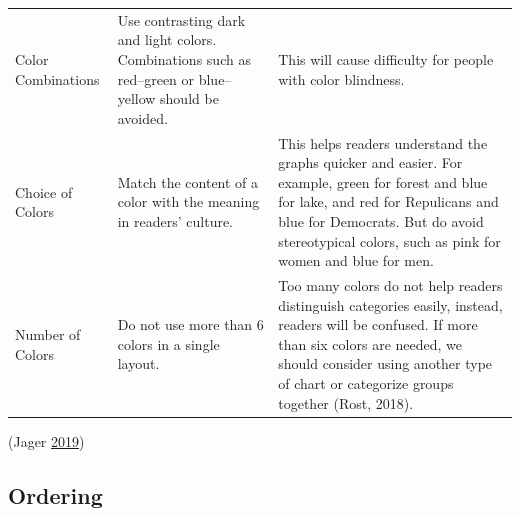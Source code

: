 \documentclass[]{book}
\begin{document}
\begin{longtable}[]{@{}lll@{}}
\begin{minipage}[t]{0.11\columnwidth}\raggedright
Color Combinations\strut
\end{minipage} & \begin{minipage}[t]{0.34\columnwidth}\raggedright
Use contrasting dark and light colors. Combinations such as red--green or blue-- yellow should be avoided.\strut
\end{minipage} & \begin{minipage}[t]{0.46\columnwidth}\raggedright
This will cause difficulty for people with color blindness.\strut
\end{minipage}\tabularnewline
\begin{minipage}[t]{0.11\columnwidth}\raggedright
Choice of Colors\strut
\end{minipage} & \begin{minipage}[t]{0.34\columnwidth}\raggedright
Match the content of a color with the meaning in readers' culture.\strut
\end{minipage} & \begin{minipage}[t]{0.46\columnwidth}\raggedright
This helps readers understand the graphs quicker and easier. For example, green for forest and blue for lake, and red for Repulicans and blue for Democrats. But do avoid stereotypical colors, such as pink for women and blue for men.\strut
\end{minipage}\tabularnewline
\begin{minipage}[t]{0.11\columnwidth}\raggedright
Number of Colors\strut
\end{minipage} & \begin{minipage}[t]{0.34\columnwidth}\raggedright
Do not use more than 6 colors in a single layout.\strut
\end{minipage} & \begin{minipage}[t]{0.46\columnwidth}\raggedright
Too many colors do not help readers distinguish categories easily, instead, readers will be confused. If more than six colors are needed, we should consider using another type of chart or categorize groups together (Rost, 2018).\strut
\end{minipage}\tabularnewline
\bottomrule
\end{longtable}

(Jager \protect\hyperlink{ref-Tom}{2019})

\hypertarget{ordering}{%
\subsection{Ordering}\label{ordering}}
\end{document}
